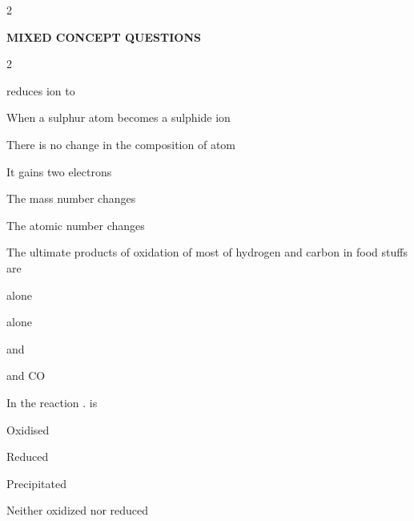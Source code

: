 \documentclass[10pt,a4paper]{article}
\begin{document}
\begin{multicols}{2}
\begin{questions}[start=138]
\end{questions}
\end{multicols}

\begin{mdframed}[backgroundcolor=sectionbg, linewidth=0pt, innerleftmargin=6pt, innerrightmargin=6pt, innertopmargin=4pt, innerbottommargin=4pt]
\color{white}\bfseries\small\centering MIXED CONCEPT QUESTIONS
\end{mdframed}

\begin{multicols}{2}
\begin{questions}[start=1]

\item {} reduces  ion to
\begin{options}
  \item {}
  \item {}
  \item {}
  \item {}
\end{options}

\item When a sulphur atom becomes a sulphide ion
\begin{options}
  \item There is no change in the composition of atom
  \item It gains two electrons
  \item The mass number changes
  \item The atomic number changes
\end{options}

\item The ultimate products of oxidation of most of hydrogen and carbon in food stuffs are
\begin{options}
  \item {} alone
  \item {} alone
  \item {} and 
  \item {} and CO
\end{options}

\item In the reaction .  is
\begin{options}
  \item Oxidised
  \item Reduced
  \item Precipitated
  \item Neither oxidized nor reduced
\end{options}


\end{questions}
\end{multicols}
\end{document}
